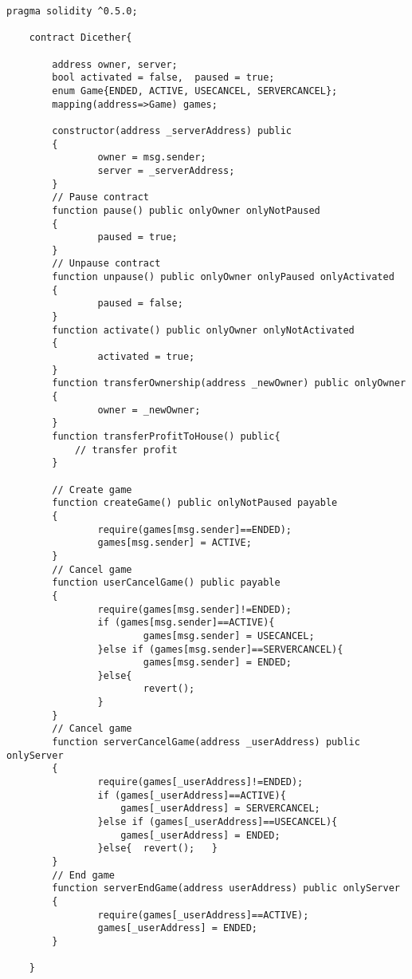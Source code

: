 \begin{lstlisting}[language=Solidity]
	pragma solidity ^0.5.0;
	
	contract Dicether{
		
		address owner, server;
		bool activated = false,  paused = true;	
		enum Game{ENDED, ACTIVE, USECANCEL, SERVERCANCEL};
		mapping(address=>Game) games;
			
		constructor(address _serverAddress) public
		{		
				owner = msg.sender;	
				server = _serverAddress;
		}
		// Pause contract 
		function pause() public onlyOwner onlyNotPaused
		{
				paused = true;
		}    
		// Unpause contract 
		function unpause() public onlyOwner onlyPaused onlyActivated
		{
				paused = false;
		}
		function activate() public onlyOwner onlyNotActivated
		{
				activated = true;
		}
		function transferOwnership(address _newOwner) public onlyOwner 
		{
				owner = _newOwner;	
		}
		function transferProfitToHouse() public{
			// transfer profit
		}
	
		// Create game 
		function createGame() public onlyNotPaused payable
		{
				require(games[msg.sender]==ENDED);
				games[msg.sender] = ACTIVE;
		}
		// Cancel game
		function userCancelGame() public payable
		{
				require(games[msg.sender]!=ENDED);
				if (games[msg.sender]==ACTIVE){
						games[msg.sender] = USECANCEL;
				}else if (games[msg.sender]==SERVERCANCEL){
						games[msg.sender] = ENDED;
				}else{
						revert();
				}
		}
		// Cancel game
		function serverCancelGame(address _userAddress)	public onlyServer
		{
				require(games[_userAddress]!=ENDED);
				if (games[_userAddress]==ACTIVE){
					games[_userAddress] = SERVERCANCEL;
				}else if (games[_userAddress]==USECANCEL){
					games[_userAddress] = ENDED;
				}else{	revert();	}
		}
		// End game
		function serverEndGame(address userAddress) public onlyServer
		{
				require(games[_userAddress]==ACTIVE);
				games[_userAddress] = ENDED;
		}
		
	}
\end{lstlisting}
